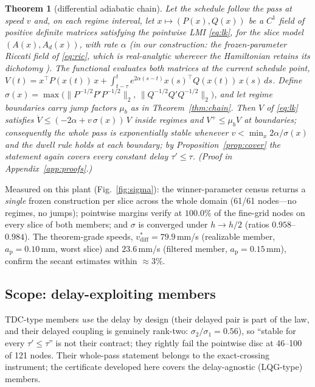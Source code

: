\documentclass[preprint,12pt]{elsarticle}
\newtheorem{theorem}{Theorem}
\newcommand{\ap}{a_{\mathrm{p}}}
\begin{document}
\begin{theorem}[differential adiabatic chain]\label{thm:diff}
Let the schedule follow the pass at speed $v$ and, on each regime
interval, let $x \mapsto (P(x), Q(x))$ be a $C^1$ field of positive
definite matrices satisfying the pointwise LMI \eqref{eq:lk}, for the
slice model $(A(x), A_d(x))$, with rate $\alpha$ (in our
construction: the frozen-parameter Riccati field of \eqref{eq:ric},
which is real-analytic wherever the Hamiltonian retains its dichotomy
\cite{Lancaster1995}).  The functional evaluates both matrices at the
\emph{current} schedule point,
$V(t) = x^{\!\top} P(x(t))\, x + \int_{t-\tau}^{t} e^{2\alpha(s-t)}
x(s)^{\!\top} Q(x(t))\, x(s)\, ds$.  Define
$\sigma(x) = \max\big(\|P^{-1/2}P'P^{-1/2}\|_2,\,
\|Q^{-1/2}Q'Q^{-1/2}\|_2\big)$, and let regime boundaries carry jump
factors $\mu_b$ as in Theorem~\ref{thm:chain}.  Then $V$ of
\eqref{eq:lk} satisfies
$\dot V \le (-2\alpha + v\,\sigma(x))\,V$ inside regimes and
$V^{+} \le \mu_b V$ at boundaries; consequently the whole pass is
exponentially stable whenever
$v < \min_x 2\alpha/\sigma(x)$ and the dwell rule holds at each
boundary; by Proposition~\ref{prop:cover} the statement again covers
every constant delay $\tau' \le \tau$.
(Proof in Appendix~\ref{app:proofs}.)
\end{theorem}

Measured on this plant (Fig.~\ref{fig:sigma}): the winner-parameter
census returns a \emph{single} frozen construction per slice across
the whole domain (61/61 nodes---no regimes, no jumps); pointwise
margins verify at $100.0\%$ of the fine-grid nodes on every slice of
both members; and $\sigma$ is converged under $h \to h/2$ (ratios
$0.958$--$0.984$).  The theorem-grade speeds,
$v^{*}_{\mathrm{diff}} = 79.9$\,mm/s (realizable member,
$\ap=0.10$\,mm, worst slice) and $23.6$\,mm/s (filtered member,
$\ap = 0.15$\,mm), confirm the secant estimates within $\approx3\%$.

\subsection{Scope: delay-exploiting members}

TDC-type members \emph{use} the delay by design (their delayed pair is
part of the law, and their delayed coupling is genuinely rank-two:
$\sigma_2/\sigma_1 = 0.56$), so ``stable for every
$\tau' \le \tau$'' is not their contract; they rightly fail the
pointwise disc at 46--100 of 121 nodes.  Their whole-pass statement
belongs to the exact-crossing instrument; the certificate developed
here covers the delay-agnostic (LQG-type) members.
\end{document}

